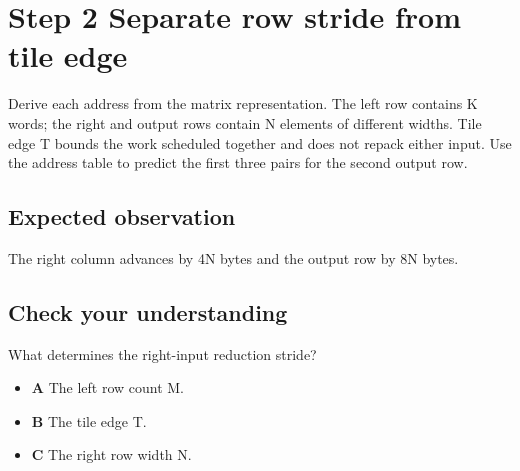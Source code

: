 \section{Step 2 Separate row stride from tile edge}\label{matmul-s02}

Derive each address from the matrix representation. The left row contains K words; the right and output rows contain N elements of different widths. Tile edge T bounds the work scheduled together and does not repack either input. Use the address table to predict the first three pairs for the second output row.

\subsection{Expected observation}
The right column advances by 4N bytes and the output row by 8N bytes.

\subsection{Check your understanding}
What determines the right-input reduction stride?

\begin{itemize}
  \item \textbf{A} The left row count M.
  \item \textbf{B} The tile edge T.
  \item \textbf{C} The right row width N.
\end{itemize}
